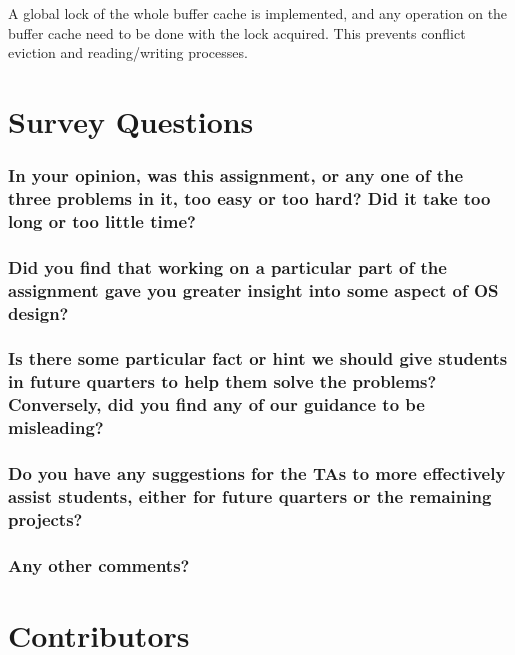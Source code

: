 \documentclass[sigconf, nonacm, balance=false, urlbreakonhyphens=true]{acmart}
\begin{document}
                A global lock of the whole buffer cache is implemented, and any operation on the buffer cache need to be done with the lock acquired. This prevents conflict eviction and reading/writing processes. 

    \section{Survey Questions}


        \subsubsection*{In your opinion, was this assignment, or any one of the three problems in it, too easy or too hard? Did it take too long or too little time? }

        \subsubsection*{Did you find that working on a particular part of the assignment gave you greater insight into some aspect of OS design? }

        \subsubsection*{Is there some particular fact or hint we should give students in future quarters to help them solve the problems? Conversely, did you find any of our guidance to be misleading? }

        \subsubsection*{Do you have any suggestions for the TAs to more effectively assist students, either for future quarters or the remaining projects? }

        \subsubsection*{Any other comments? }
    
    \section*{Contributors}
\end{document}
